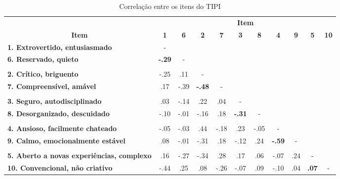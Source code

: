 \begin{sidewaystable}[ph!]
\footnotesize
\caption{\small Correlação entre os itens do TIPI}
\renewcommand{\arraystretch}{1.4} 
\centering

    \begin{tabular}{lcccccccccc}
    \toprule
          & \multicolumn{10}{c}{\textbf{Item}} \\
    \multicolumn{1}{c}{\textbf{Item}} & \textbf{1} & \textbf{6} & \textbf{2} & \textbf{7} & \textbf{3} & \textbf{8} & \textbf{4} & \textbf{9} & \textbf{5} & \textbf{10} \\
		\midrule
    \multicolumn{1}{l}{\textbf{1. Extrovertido, entusiasmado}} 						& -     &       &       &       &       &       &       &       &       &  \\
    \multicolumn{1}{l}{\textbf{6. Reservado, quieto}} 										& \textbf{-.29}	& -     &       &       &       &       &       &       &       &  \\
    \textbf{} & & & & & & & & & &  \\
    \multicolumn{1}{l}{\textbf{2. Crítico, briguento}} 										& -.25  & .11   & -     &       &       &       &       &       &       &  \\
    \multicolumn{1}{l}{\textbf{7. Compreensível, amável}} 								& .17   & -.39  & \textbf{-.48} & -     &       &       &       &       &       &  \\
    \textbf{} & & & & & & & & & &  \\
    \multicolumn{1}{l}{\textbf{3. Seguro, autodisciplinado}} 						  & .03   & -.14  & .22   & .04   & -     &       &       &       &       &  \\
    \multicolumn{1}{l}{\textbf{8. Desorganizado, descuidado}} 						& -.10  & -.01  & -.16  & .18   & \textbf{-.31} & -     &       &       &       &  \\
    \textbf{} & & & & & & & & & &  \\
    \multicolumn{1}{l}{\textbf{4. Ansioso, facilmente chateado}} 					& -.05  & -.03  & .44   & -.18  & .23   & -.05  & -     &       &       &  \\
    \multicolumn{1}{l}{\textbf{9. Calmo, emocionalmente estável}} 				& .08   & -.01  & -.31  & .18   & -.12  & .24   & \textbf{-.59} & -     &       &  \\
    \textbf{} & & & & & & & & & &  \\
    \multicolumn{1}{l}{\textbf{5. Aberto a novas experiências, complexo}} & .16   & -.27  & -.34  & .28   & .17   & .06   & -.07  & .24   & -     &  \\
    \multicolumn{1}{l}{\textbf{10. Convencional, não criativo}} 					& -.44  & .25   & .08   & -.26  & -.07  & .09   & -.10  & .04   & \textbf{.07} & - \\
    

\end{tabular}
\end{sidewaystable}
